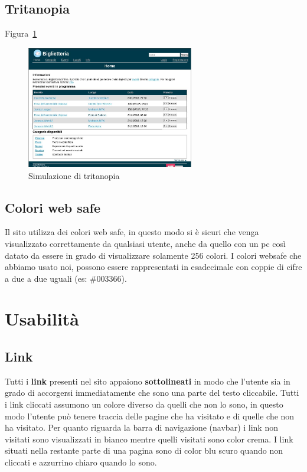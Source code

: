 \documentclass[10pt, a4paper]{article}
\begin{document}
\subsection{Tritanopia}
Figura~\ref{fig:tritanope}
\begin{figure}[H]
	\centering
	\includegraphics[width=0.65\textwidth]{Images/Tritanope.jpg}
	\caption{Simulazione di tritanopia}
	\label{fig:tritanope}
\end{figure}





\subsection{Colori web safe}
Il sito utilizza dei colori web safe, in questo modo si è sicuri che venga visualizzato correttamente
da qualsiasi utente, anche da quello con un pc così datato da essere in grado di visualizzare solamente
256 colori. I colori websafe che abbiamo usato noi, possono essere rappresentati in esadecimale
con coppie di cifre a due a due uguali (es: \#003366).
      

\section{Usabilità}
\subsection{Link}
Tutti i \textbf{link} presenti nel sito appaiono \textbf{sottolineati} in modo che l'utente sia in 
grado di accorgersi immediatamente che sono una parte del testo cliccabile.
Tutti i link cliccati assumono un colore diverso da quelli che non lo sono, in questo modo
l'utente può tenere traccia delle pagine che ha visitato e di quelle che non ha visitato.
Per quanto riguarda la barra di navigazione (navbar) i link non visitati sono visualizzati
in bianco mentre quelli visitati sono color \textcolor{Crema}{crema}. 
I link situati nella restante parte di una pagina sono di color 
\textcolor{LinkNormNoClick}{blu scuro} quando non cliccati e 
\textcolor{LinkNormClick}{azzurrino chiaro} quando lo sono.
\end{document}
